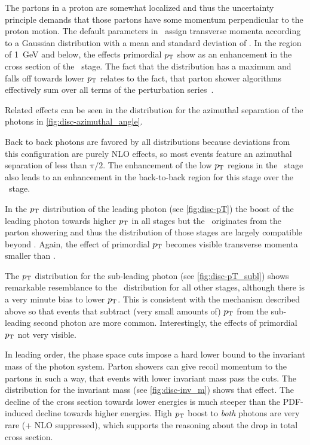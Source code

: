 The partons in a proton are somewhat localized and thus the
uncertainty principle demands that those partons have some momentum
perpendicular to the proton motion. The default parameters in \sherpa\
assign transverse momenta according to a Gaussian distribution with a
mean and standard deviation of \gev{.8}.  In the region of
\SI{1}{\giga\electronvolt} and below, the effects primordial \(p_\mathrm{T}\)
show as an enhancement in the cross section of the \stthree\ stage.
The fact that the distribution has a maximum and falls off towards
lower \(p_\mathrm{T}\) relates to the fact, that parton shower algorithms
effectively sum over all terms of the perturbation
series~\cite{buckley:2011ge}.

Related effects can be seen in the distribution for the azimuthal
separation of the photons in \cref{fig:disc-azimuthal_angle}.

Back to back photons are favored by all distributions because
deviations from this configuration are purely NLO effects, so most
events feature an azimuthal separation of less than \(\pi/2\).  The
enhancement of the low \(p_\mathrm{T}\) regions in the \stthree\ stage also
leads to an enhancement in the back-to-back region for this stage over
the \sttwo\ stage.

In the \(p_\mathrm{T}\) distribution of the leading photon (see
\cref{fig:disc-pT}) the boost of the leading photon towards higher
\(p_\mathrm{T}\) in all stages but the \stone\ originates from the parton
showering and thus the distribution of those stages are largely
compatible beyond . Again, the effect of primordial \(p_\mathrm{T}\)
becomes visible transverse momenta smaller than \gev{1}.


The \(p_\mathrm{T}\) distribution for the sub-leading photon (see
\cref{fig:disc-pT_subl}) shows remarkable resemblance to the \stone\
distribution for all other stages, although there is a very minute
bias to lower \(p_\mathrm{T}\). This is consistent with the mechanism described
above so that events that subtract (very small amounts of) \(p_\mathrm{T}\)
from the sub-leading second photon are more common. Interestingly, the
effects of primordial \(p_\mathrm{T}\) not very visible.

In leading order, the phase space cuts impose a hard lower bound to
the invariant mass of the photon system. Parton showers can give
recoil momentum to the partons in such a way, that events with lower
invariant mass pass the cuts. The distribution for the invariant mass
(see \cref{fig:disc-inv_m}) shows that effect. The decline of the
cross section towards lower energies is much steeper than the
PDF-induced decline towards higher energies. High \(p_\mathrm{T}\) boost to
\emph{both} photons are very rare (+ NLO suppressed), which supports
the reasoning about the drop in total cross section.


